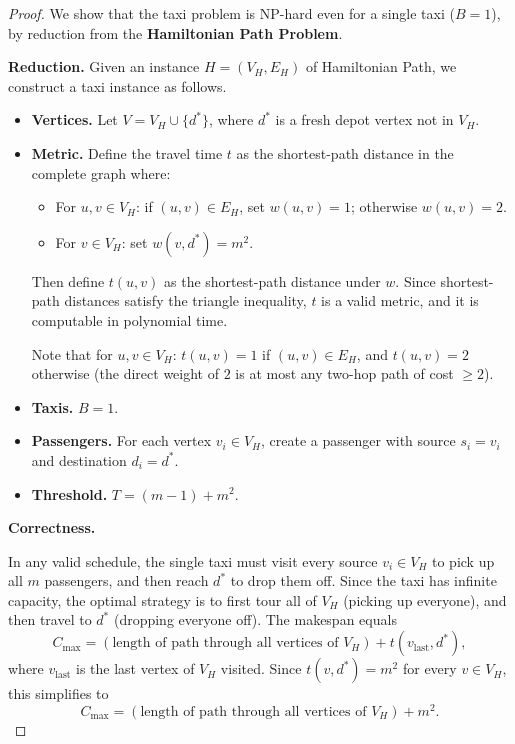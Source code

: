 \begin{proof}
We show that the taxi problem is NP-hard even for a single taxi ($B = 1$), by reduction from the \textbf{Hamiltonian Path Problem}.

\medskip
\noindent\textbf{Reduction.}
Given an instance $H = (V_H, E_H)$ of Hamiltonian Path, we construct a taxi instance as follows.

\begin{itemize}
    \item \textbf{Vertices.} Let $V = V_H \cup \{d^*\}$, where $d^*$ is a fresh depot vertex not in $V_H$.

    \item \textbf{Metric.} Define the travel time $t$ as the shortest-path distance in the complete graph where:
    \begin{itemize}
        \item For $u, v \in V_H$: if $(u,v) \in E_H$, set $w(u,v) = 1$; otherwise $w(u,v) = 2$.
        \item For $v \in V_H$: set $w(v, d^*) = m^2$.
    \end{itemize}
    Then define $t(u,v)$ as the shortest-path distance under $w$. Since shortest-path distances satisfy the triangle inequality, $t$ is a valid metric, and it is computable in polynomial time.

    Note that for $u,v \in V_H$: $t(u,v) = 1$ if $(u,v) \in E_H$, and $t(u,v) = 2$ otherwise (the direct weight of $2$ is at most any two-hop path of cost $\geq 2$).

    \item \textbf{Taxis.} $B = 1$.

    \item \textbf{Passengers.} For each vertex $v_i \in V_H$, create a passenger with source $s_i = v_i$ and destination $d_i = d^*$.

    \item \textbf{Threshold.} $T = (m - 1) + m^2$.
\end{itemize}

\noindent\textbf{Correctness.}

In any valid schedule, the single taxi must visit every source $v_i \in V_H$ to pick up all $m$ passengers, and then reach $d^*$ to drop them off. Since the taxi has infinite capacity, the optimal strategy is to first tour all of $V_H$ (picking up everyone), and then travel to $d^*$ (dropping everyone off). The makespan equals
\[
    C_{\max} = (\text{length of path through all vertices of } V_H) + t(v_{\text{last}}, d^*),
\]
where $v_{\text{last}}$ is the last vertex of $V_H$ visited. Since $t(v, d^*) = m^2$ for every $v \in V_H$, this simplifies to
\[
    C_{\max} = (\text{length of path through all vertices of } V_H) + m^2.
\]


\end{proof}
